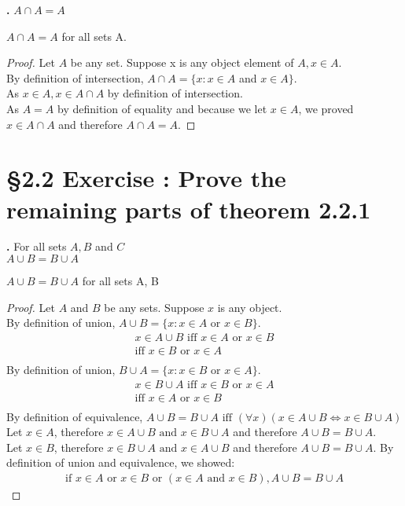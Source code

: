 \documentclass[a4paper,11pt]{article}
\begin{document}
\addtocounter{SubsectionCounter}{4}
\noindent\textbf{.}
\(A \cap A = A\)

\begin{theorem4}
\(A \cap A = A\) for all sets A.
\begin{proof}
Let \(A\) be any set. Suppose x is any object element of \(A, x \in A\).\\
By definition of intersection, \(A \cap A = \{x: x \in A\) and \(x \in A\}\).\\
As \(x \in A, x \in A \cap A\) by definition of intersection.\\
As \(A=A\) by definition of equality and because we let \(x \in A\), we proved \(x \in A \cap A\) and 
therefore \(A \cap A = A\).
\end{proof}
\end{theorem4}

\newpage

\setcounter{ProblemCounter}{7}
\setcounter{SubsectionCounter}{7}
\section*{\S 2.2 Exercise : Prove the remaining parts of theorem 2.2.1 }
\textbf{.}
For all sets \(A, B\) and \(C\)\\
\(A \cup B = B \cup A\)
\begin{theorem4}
\(A \cup B = B \cup A\) for all sets A, B
\begin{proof}
Let \(A\) and \(B\) be any sets. Suppose \(x\) is any object.\\
By definition of union, \(A \cup B = \{x: x \in A\) or \(x \in B\}\).
\begin{align*}
x \in A \cup B \text{ iff } x \in A \text{ or } x \in B\\
\text{iff } x \in B \text{ or } x \in A\\
\end{align*}
By definition of union, \(B \cup A = \{x: x \in B \text{ or } x \in A\}\).
\begin{align*}
x \in B \cup A \text{ iff } x \in B \text{ or } x \in A\\
\text{iff } x \in A \text{ or } x \in B\\
\end{align*}
By definition of equivalence,
\(A \cup B = B \cup A \text{ iff } (\forall x)(x \in A \cup B \Leftrightarrow x \in B \cup 
A)\)
Let \(x \in A\), therefore \(x \in A \cup B \text{ and } x \in B \cup A\) and 
therefore \(A \cup B = B \cup A\).\\
Let \(x \in B\), therefore \(x \in B \cup A \text{ and } x \in A \cup B\) and 
therefore \(A \cup B = B \cup A\).
By definition of union and equivalence, we showed:
\begin{align*}
\text{if } x \in A \text{ or } x \in B \text{ or } (x \in A \text{ and } x \in B), A \cup B = B \cup A 
\end{align*}
\end{proof}
\end{theorem4}
\end{document}
